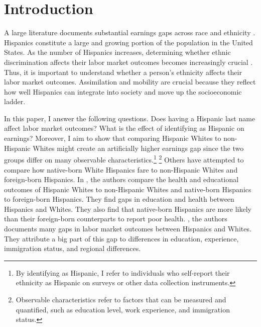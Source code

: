 \documentclass{wptemp}
\begin{document}
\section{Introduction}\label{sec:intro}

A large literature documents substantial earnings gaps across race and ethnicity \citep{bayer2018divergent, charles2008prejudice, card1992school, fryer2004causes, rubinstein2014pride, bertrand2004emily, juhn1991accounting}. Hispanics constitute a large and growing portion of the population in the United States. As the number of Hispanics increases, determining whether ethnic discrimination affects their labor market outcomes becomes increasingly crucial \citep{chettyUnitedStatesStill2014, chettyEffectsExposureBetter2016,chettyFadingAmericanDream2017,abramitzkyImmigrantsAssimilateMore2020a, abramitzkyNationImmigrantsAssimilation2014,abramitzkyCulturalAssimilationAge2016,chettyWhereLandOpportunity2014}. Thus, it is important to understand whether a person's ethnicity affects their labor market outcomes. Assimilation and mobility are crucial because they reflect how well Hispanics can integrate into society and move up the socioeconomic ladder.

In this paper, I answer the following questions. Does having a Hispanic last name affect labor market outcomes? What is the effect of identifying as Hispanic on earnings? Moreover, I aim to show that comparing Hispanic Whites to non-Hispanic Whites might create an artificially higher earnings gap since the two groups differ on many observable characteristics.\footnote{By identifying as Hispanic, I refer to individuals who self-report their ethnicity as Hispanic on surveys or other data collection instruments.} \footnote{Observable characteristics refer to factors that can be measured and quantified, such as education level, work experience, and immigration status.} Others have attempted to compare how native-born White Hispanics fare to non-Hispanic Whites and foreign-born Hispanics. In \citet{antman2020ethnic,antmanEthnicAttritionObserved2016,antmanEthnicAttritionObserved2016a,antmanEthnicAttritionAssimilation2020}, the authors compare the health and educational outcomes of Hispanic Whites to non-Hispanic Whites and native-born Hispanics to foreign-born Hispanics. They find gaps in education and health between Hispanics and Whites. They also find that native-born Hispanics are more likely than their foreign-born counterparts to report poor health. \citet{davilaChangesRelativeEarnings2008}, the authors documents many gaps in labor market outcomes between Hispanics and Whites. They attribute a big part of this gap to differences in education, experience, immigration status, and regional differences. 
\end{document}
